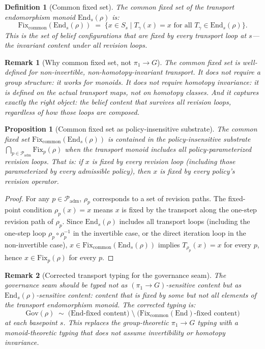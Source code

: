 \documentclass[11pt]{article}
\newtheorem{definition}{Definition}
\newtheorem{proposition}{Proposition}
\newtheorem{remark}{Remark}
\newcommand{\Gov}{\mathrm{Gov}}
\newcommand{\Fix}{\mathrm{Fix}}
\newcommand{\Padm}{\mathcal{P}_{\mathrm{adm}}}
\newcommand{\End}{\mathrm{End}}
\newcommand{\Fixcommon}{\mathrm{Fix}_{\mathrm{common}}}
\begin{document}
\begin{definition}[Common fixed set]
\label{def:common-fixed}
The \emph{common fixed set} of the transport endomorphism monoid $\End_s(\rho)$ is:
\[
  \Fixcommon(\End_s(\rho)) \;=\; \{ x \in S_s \mid T_\gamma(x) = x \text{ for all }
  T_\gamma \in \End_s(\rho) \}.
\]
This is the set of belief configurations that are fixed by every transport loop at $s$---the
\emph{invariant content under all revision loops}.
\end{definition}

\begin{remark}[Why common fixed set, not $\pi_1 \to G$]
The common fixed set is well-defined for non-invertible, non-homotopy-invariant transport.
It does not require a group structure: it works for monoids. It does not require
homotopy invariance: it is defined on the actual transport maps, not on homotopy classes.
And it captures exactly the right object: the belief content that survives all revision loops,
regardless of how those loops are composed.
\end{remark}

\begin{proposition}[Common fixed set as policy-insensitive substrate]
\label{prop:common-fixed-substrate}
The common fixed set $\Fixcommon(\End_s(\rho))$ is contained in the policy-insensitive substrate
$\bigcap_{p \in \Padm} \Fix_p(\rho)$ when the transport monoid includes all policy-parameterized
revision loops. That is: if $x$ is fixed by every revision loop (including those parameterized
by every admissible policy), then $x$ is fixed by every policy's revision operator.
\end{proposition}

\begin{proof}
For any $p \in \Padm$, $\rho_p$ corresponds to a set of revision paths. The fixed-point
condition $\rho_p(x) = x$ means $x$ is fixed by the transport along the one-step revision
path of $\rho_p$. Since $\End_s(\rho)$ includes all transport loops (including the one-step
loop $\rho_p \circ \rho_p^{-1}$ in the invertible case, or the direct iteration loop in the
non-invertible case), $x \in \Fixcommon(\End_s(\rho))$ implies $T_{\rho_p}(x) = x$ for every
$p$, hence $x \in \Fix_p(\rho)$ for every $p$.
\end{proof}

\begin{remark}[Corrected transport typing for the governance seam]
\label{rem:corrected-typing}
The governance seam should be typed not as $(\pi_1 \to G)$-sensitive content but as
$\End_s(\rho)$-sensitive content: content that is fixed by some but not all elements of the
transport endomorphism monoid. The corrected typing is:
\[
  \Gov(\rho) \;\sim\; \bigl(\text{$\End$-fixed content}\bigr) \;\setminus\;
  \bigl(\text{$\Fixcommon(\End)$-fixed content}\bigr)
\]
at each basepoint $s$. This replaces the group-theoretic $\pi_1 \to G$ typing with a
monoid-theoretic typing that does not assume invertibility or homotopy invariance.
\end{remark}
\end{document}
